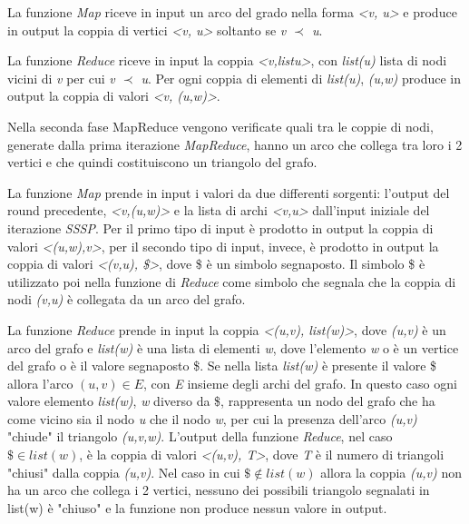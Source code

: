 \documentclass[LaM,binding=0.6cm]{sapthesis}
\begin{document}
La funzione \textit{Map} riceve in input un arco del grado nella forma \textit{<v, u>} e produce in output la coppia di vertici \textit{<v, u>} soltanto se \textit{v $\prec$ u}.

La funzione \textit{Reduce} riceve in input la coppia \textit{<v,list{u}>}, con \textit{list(u)} lista di nodi vicini di \textit{v} per cui \textit{v $\prec$ u}. Per ogni coppia di elementi  di \textit{list(u)}, \textit{(u,w)} produce in output la coppia di valori \textit{<v, (u,w)>}.

\begin{minipage}{\linewidth}
	
\end{minipage}
\begin{minipage}{\linewidth}
	
\end{minipage}

Nella seconda fase MapReduce vengono verificate quali tra le coppie di nodi, generate dalla prima iterazione \textit{MapReduce}, hanno un arco che collega tra loro i 2 vertici e che quindi costituiscono un triangolo del grafo. 

La funzione \textit{Map} prende in input i valori da due differenti sorgenti: l'output del round precedente, \textit{<v,(u,w)>} e la lista di archi \textit{<v,u>} dall'input iniziale del iterazione \textit{SSSP}. Per il primo tipo di input è prodotto in output la coppia di valori \textit{<(u,w),v>}, per il secondo tipo di input, invece, è prodotto in output la coppia di valori \textit{<(v,u), \$>}, dove \$ è un simbolo segnaposto. Il simbolo \$ è utilizzato poi nella funzione di \textit{Reduce} come simbolo che segnala che la coppia di nodi \textit{(v,u)} è collegata da un arco del grafo.

La funzione \textit{Reduce} prende in input la coppia \textit{<(u,v), list(w)>}, dove \textit{(u,v)} è un arco del grafo e \textit{list(w)} è una lista di elementi \textit{w}, dove  l'elemento \textit{w} o è un vertice del grafo o è il valore segnaposto \$.
Se nella lista \textit{list(w)} è presente il valore \$ allora l'arco \textit{$(u,v) \in E$}, con \textit{E} insieme degli archi del grafo. In questo caso ogni valore elemento \textit{list(w)}, \textit{w} diverso da \$, rappresenta un nodo del grafo che ha come vicino sia il nodo \textit{u} che il nodo \textit{w}, per cui la presenza dell'arco \textit{(u,v)} "chiude" il triangolo \textit{(u,v,w)}. 
L'output della funzione \textit{Reduce}, nel caso \textit{$\$\in list(w)$}, è la coppia di valori \textit{<(u,v), T>}, dove \textit{T} è il numero di triangoli "chiusi" dalla coppia \textit{(u,v)}. Nel caso in cui \textit{$\$\notin list(w)$} allora la coppia \textit{(u,v)} non ha un arco che collega i 2 vertici, nessuno dei possibili triangolo segnalati in list(w) è "chiuso" e la funzione non produce nessun valore in output.
\end{document}
